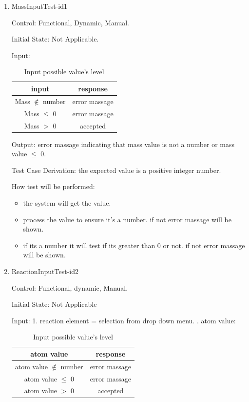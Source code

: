 \documentclass[12pt, titlepage]{article}
\begin{document}
\begin{enumerate}

\item{MassInputTest-id1\\}

Control: Functional, Dynamic, Manual.
					
Initial State: Not Applicable.
					
Input: 
\begin{table}[h!]
\centering
\begin{tabular}{|c|c|}
\hline
input & response  \\
\hline
Mass $\notin$ number  & error massage \\ \hline
Mass $\leq$ 0& error massage \\ \hline
Mass $>$ 0  & accepted\\ \hline
\hline
\end{tabular}
\caption{Input possible value's level }
\label{tab:reqtrace}
\end{table}

					
Output: error massage indicating that mass value is not a number or mass value $\leq$ 0. 

Test Case Derivation: the expected value is a positive integer number. 
					
How test will be performed: 
\begin{itemize}
\item the system will get the value. 
\item process the value to ensure it's a number. if not error massage will be shown.
\item if its a number it will test if its greater than 0 or not.  if not error massage will be shown.
\end{itemize}



\item{ReactionInputTest-id2\\}

Control: Functional, dynamic, Manual.
					
Initial State: Not Applicable
					
Input: 
1. reaction element = selection from drop down menu.
. atom value: 
\begin{table}[h!]
\centering
\begin{tabular}{|c|c|}
\hline
atom value & response  \\
\hline
atom value $\notin$ number  & error massage \\ \hline
atom value $\leq$ 0& error massage \\ \hline
atom value $>$ 0  & accepted\\ \hline
\hline
\end{tabular}
\caption{Input possible value's level }
\label{tab:reqtrace}
\end{table}
	

\end{enumerate}
\end{document}
